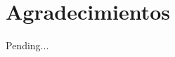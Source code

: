 \chapter*{Agradecimientos}

Pending...
\iffalse
A Dios \ldots

Gracias a la Universidad Aut\'{o}noma de Nuevo Le\'{o}n y a la Facultad de Ingenier\'{\i}a Mec\'{a}nica y El\'{e}ctrica por el apoyo prestado durante el transcurso de la carrera.

A mis padres \ldots

No olvidar al asesor, sinodales, instituciones que dieron apoyo.
\fi
\newpage

